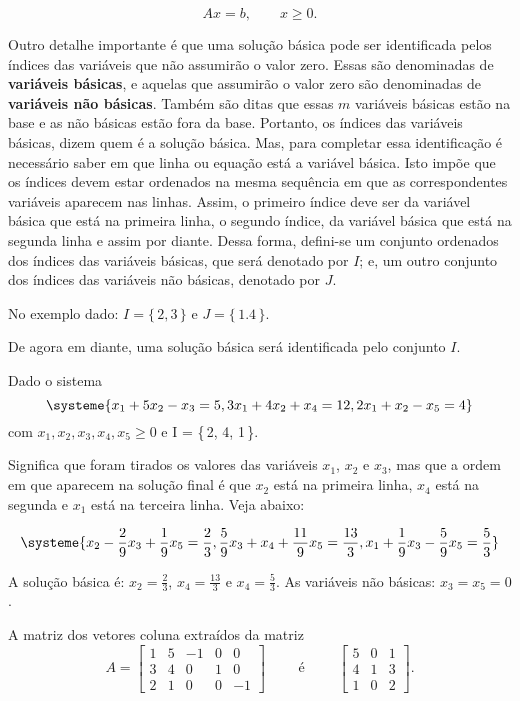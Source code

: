 \[
  Ax = b, \qquad x \geq 0.
\]

Outro detalhe importante é que uma solução básica pode ser identificada pelos
índices das variáveis que não assumirão o valor zero.
Essas são denominadas de \textbf{variáveis básicas}, e aquelas que assumirão o
valor zero são denominadas de \textbf{variáveis não básicas}.
Também são ditas que essas $ m $ variáveis básicas estão na base e as não básicas
estão fora da base.
Portanto, os índices das variáveis básicas, dizem quem é a solução básica.
Mas, para completar essa identificação é necessário saber em que linha ou 
equação está a variável básica.
Isto impõe que os índices devem estar ordenados na mesma sequência em que as
correspondentes variáveis aparecem nas linhas.
Assim, o primeiro índice deve ser da variável básica que está na primeira linha,
o segundo índice, da variável básica que está na segunda linha e assim por 
diante.
Dessa forma, defini-se um conjunto ordenados dos índices das variáveis básicas,
que será denotado por $ I $; e, um outro conjunto dos índices das variáveis não
básicas, denotado por $ J $.

No exemplo dado: $ I = \{\,2, 3\,\} $ e $ J = \{\,1. 4\,\} $.

De agora em diante, uma solução básica será identificada pelo conjunto $ I $.

\begin{exemplo}
  Dado o sistema 
  \[
   \systeme
   {
     x_1 + 5x_2 - x_3 =  5,
    3x_1 + 4x_2 + x_4 = 12,
    2x_1 +  x_2 - x_5 =  4
   }
  \]
  com $ x_1, x_2, x_3, x_4, x_5 \geq 0 $ e I = \{\,2, 4, 1\,\}.
\end{exemplo}


Significa que foram tirados  os valores das variáveis $ x_1 $, $ x_2 $ e $ x_3 $,
mas que a ordem em que aparecem na solução final é que $ x_2 $ está na primeira
linha, $ x_4 $ está na segunda e $ x_1 $ está na terceira linha.
Veja abaixo:

\[
  \systeme
  {
   x_2 - \frac{2}{9}x_3 + \frac{1}{9}x_5  = \frac{2}{3},
   \frac{5}{9}x_3 + x_4 + \frac{11}{9}x_5 = \frac{13}{3},
   x_1 + \frac{1}{9}x_3 - \frac{5}{9}x_5  = \frac{5}{3}
  }
\]

A solução básica é: $ x_2 = \frac{2}{3} $, $ x_4 = \frac{13}{3} $ e 
$ x_4 = \frac{5}{3} $.
As variáveis não básicas: $ x_3 = x_5 = 0 $.

A matriz dos vetores coluna extraídos da matriz \\

\[ 
  A = 
  \begin{bmatrix} 
   1 & 5 & -1 & 0 &  0 \\
   3 & 4 &  0 & 1 &  0 \\
   2 & 1 &  0 & 0 & -1
  \end{bmatrix} 
  \qquad
  \text{ é }
  \qquad
  \begin{bmatrix}
   5 & 0 & 1 \\
   4 & 1 & 3 \\
   1 & 0 & 2
  \end{bmatrix}.
\]

